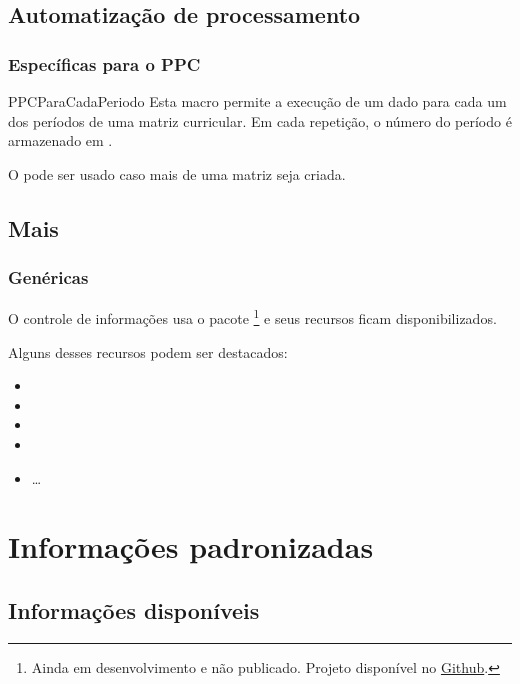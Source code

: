 \documentclass[a4paper, 11pt]{article}
\begin{document}
\subsection{Automatização de processamento}

\subsubsection*{Específicas para o PPC}

\begin{Macrodef}{PPCParaCadaPeriodo}{}{}
    Esta macro permite a execução de um dado  para cada um dos períodos de uma matriz curricular. Em cada repetição, o número do período é armazenado em .

    O  pode ser usado caso mais de uma matriz seja criada.
\end{Macrodef}

\subsection{Mais}

\subsubsection*{Genéricas}
O controle de informações usa o pacote \footnote{Ainda em desenvolvimento e não publicado. Projeto disponível no \href{https://github.com/jandermoreira/attrtoolbox}{Github}.} e seus recursos ficam disponibilizados.

Alguns desses recursos podem ser destacados:
\begin{itemize}
    \item {}
    \item {}
    \item {}
    \item {}
    \item \ldots
\end{itemize}


\section{Informações padronizadas}

\subsection{Informações disponíveis}
\end{document}
